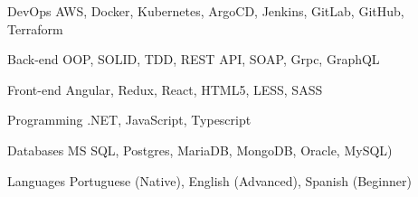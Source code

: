 

\begin{cvskills}

  \cvskill
    {DevOps} %
    {AWS, Docker, Kubernetes, ArgoCD, Jenkins, GitLab, GitHub, Terraform} %

  \cvskill
    {Back-end} %
    {OOP, SOLID, TDD, REST API, SOAP, Grpc, GraphQL} %

  \cvskill
    {Front-end} %
    {Angular, Redux, React, HTML5, LESS, SASS} %

  \cvskill
    {Programming} %
    {.NET, JavaScript, Typescript} %
    
  \cvskill
    {Databases} %
    {MS SQL, Postgres, MariaDB, MongoDB, Oracle, MySQL)} %
    
  \cvskill
    {Languages} %
    {Portuguese (Native), English (Advanced), Spanish (Beginner)} %


\end{cvskills}
